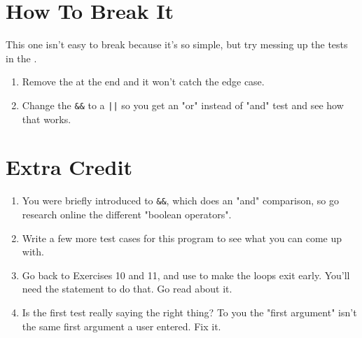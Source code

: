 \section{How To Break It}
This one isn't easy to break because it's so simple, but try messing up the
tests in the .

\begin{enumerate}
\item Remove the  at the end and it won't catch the edge case.
\item Change the \verb|&&| to a \verb,||, so you get an "or" instead of "and" test
    and see how that works.
\end{enumerate}

\section{Extra Credit}

\begin{enumerate}
\item You were briefly introduced to \verb|&&|, which does an "and" comparison,
    so go research online the different "boolean operators".
\item Write a few more test cases for this program to see what you can come
    up with.
\item Go back to Exercises 10 and 11, and use  to make
    the loops exit early.  You'll need the  statement to do that.
    Go read about it.
\item Is the first test really saying the right thing?  To you the "first argument"
    isn't the same first argument a user entered.  Fix it.
\end{enumerate}

